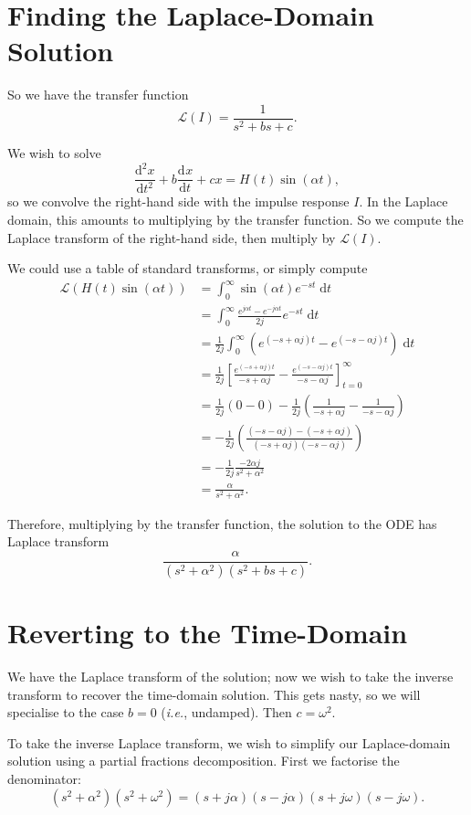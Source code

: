 \documentclass{article}
\newcommand{\deriv}[3][]{\frac{\mathrm{d}^{#1}#2}{\mathrm{d}#3^{#1}}}
\newcommand{\diff}{\;\mathrm{d}}
\begin{document}
\section{Finding the Laplace-Domain Solution}

So we have the transfer function
\[\mathcal{L}(I)=\frac{1}{s^2+bs+c}.\]

We wish to solve
\[\deriv[2]{x}{t}+b\deriv{x}{t}+cx = H(t)\sin(\alpha t),\]
so we convolve the right-hand side with the impulse response $I$. In the Laplace domain, this amounts to multiplying by the transfer function. So we compute the Laplace transform of the right-hand side, then multiply by $\mathcal{L}(I)$.

We could use a table of standard transforms, or simply compute
\begin{align*}
	\mathcal{L}(H(t)\sin(\alpha t))&=\int_0^\infty \sin(\alpha t)e^{-st}\diff t\\
	&=\int_0^\infty \frac{e^{j\alpha t}-e^{-j\alpha t}}{2j}e^{-st}\diff t\\
	&= \frac{1}{2j}\int_0^\infty \left(e^{(-s+\alpha j)t}-e^{(-s-\alpha j)t}\right)\diff t\\
	&=\frac{1}{2j}\left[\frac{e^{(-s+\alpha j)t}}{-s+\alpha j} - \frac{e^{(-s-\alpha j)t}}{-s-\alpha j}\right]_{t=0}^\infty\\
	&=\frac{1}{2j}\left(0-0\right)-\frac{1}{2j}\left(\frac{1}{-s+\alpha j}-\frac{1}{-s-\alpha j}\right)\\
	&=-\frac{1}{2j}\left(\frac{(-s-\alpha j) - (-s+\alpha j)}{(-s+\alpha j)(-s-\alpha j)}\right)\\
	&=-\frac{1}{2j}\frac{-2\alpha j}{s^2+\alpha^2}\\
	&=\frac{\alpha}{s^2+\alpha^2}.
\end{align*}

Therefore, multiplying by the transfer function, the solution to the ODE has Laplace transform
\[\frac{\alpha}{(s^2+\alpha^2)(s^2+bs+c)}.\]\bigskip



\section{Reverting to the Time-Domain}

We have the Laplace transform of the solution; now we wish to take the inverse transform to recover the time-domain solution. This gets nasty, so we will specialise to the case $b=0$ (\textit{i.e.}, undamped). Then $c=\omega^2$.

To take the inverse Laplace transform, we wish to simplify our Laplace-domain solution using a partial fractions decomposition. First we factorise the denominator:
\[(s^2+\alpha^2)(s^2+\omega^2)=(s+j\alpha)(s-j\alpha)(s+j\omega)(s-j\omega).\]
\end{document}
